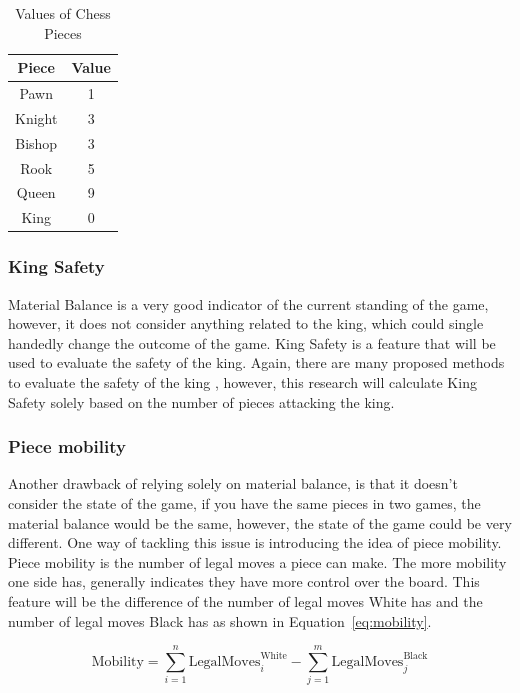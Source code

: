 \documentclass{article}
\begin{document}
\begin{table}[h]
    \centering
    \begin{tabular}{|c|c|}
        \hline
        \textbf{Piece} & \textbf{Value} \\
        \hline
        Pawn & 1 \\
        Knight & 3 \\
        Bishop & 3 \\
        Rook & 5 \\
        Queen & 9 \\
        King & 0 \\
        \hline
    \end{tabular}
    \caption{Values of Chess Pieces}
    \label{tab:values}
\end{table}





\subsubsection{King Safety}
\label{sec:kingsafety}
Material Balance is a very good indicator of the current standing of the game, however, it does not
consider anything related to the king, which could single handedly change the outcome of the game. King
Safety is a feature that will be used to evaluate the safety of the king. Again, there are many proposed
methods to evaluate the safety of the king \cite{KingSafetyChessprogramming}, however, this research will 
calculate King Safety solely based on the number of pieces attacking the king.


\subsubsection{Piece mobility}
\label{sec:mobility}
Another drawback of relying solely on material balance, is that it doesn't consider the state of the game, if you have the 
same pieces in two games, the material balance would be the same, however, the state of the game could be very different.
One way of tackling this issue is introducing the idea of piece mobility. Piece mobility is the number of legal moves a piece
can make. The more mobility one side has, generally indicates they have more control over the board. This feature will be the 
difference of the number of legal moves White has and the number of legal moves Black has as shown in Equation~\ref{eq:mobility}.

\begin{equation}
    \label{eq:mobility}
    \text{Mobility} = \sum_{i=1}^{n} \text{LegalMoves}_i^{\text{White}} - \sum_{j=1}^{m} \text{LegalMoves}_j^{\text{Black}}
\end{equation}
\end{document}
